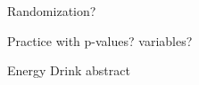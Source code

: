 \def\theTopic{Reading 12}

Randomization?  

Practice with p-values?
variables?


Energy Drink abstract

